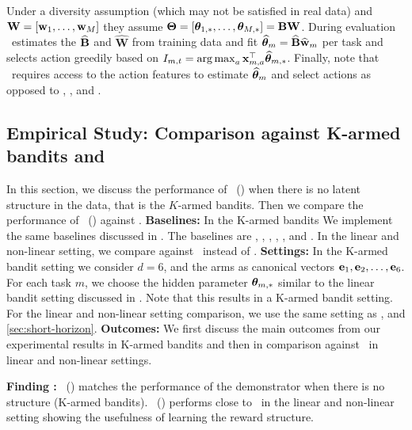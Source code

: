 \documentclass[10pt]{article}
\theoremstyle{plain}
\theoremstyle{definition}
\theoremstyle{remark}
\newcounter{findingcounter}
\newcommand{\customfinding}[1][\normalfont]{\stepcounter{findingcounter}\textbf{Finding \thefindingcounter:}#1 }
\begin{document}
Under a diversity assumption (which may not be satisfied in real data) and $\mathbf{W}=\left[\mathbf{w}_1, \ldots, \mathbf{w}_M\right]$ they assume $\mathbf{\Theta} =\left[\boldsymbol{\theta}_{1,*}, \ldots, \boldsymbol{\theta}_{M,*}\right]=\mathbf{B} \mathbf{W}$.
During evaluation \mlin\ estimates the $\mathbf{\widehat{B}}$ and $\widehat{\mathbf{W}}$ from training data and fit $\widehat{\boldsymbol{\theta}}_{m}=\mathbf{\widehat{B}} \widehat{\mathbf{w}}_m$ per task and selects action greedily based on $I_{m,t} = \mathop{\rm arg\,max}_a \mathbf{x}_{m,a}^\top\widehat{\boldsymbol{\theta}}_{m,*}$. Finally, note that \mlin\ requires access to the action features to estimate $\widehat{\boldsymbol{\theta}}_{m}$ and select actions as opposed to \dpt, \ad, and \pred.
\subsection{Empirical Study: Comparison against K-armed bandits and \dpt}
\label{sec:k_arms_dpt}
In this section, we discuss the performance of \pred\ (\gt) when there is no latent structure in the data, that is the $K$-armed bandits. Then we compare the performance of \pred\ (\gt) against \dpt.
\textbf{Baselines:} In the K-armed bandits We implement the same baselines discussed in . The baselines are \pred, \predt, \dptg, \ad, \ts, and \linucb. In the linear and non-linear setting, we compare against \dpt\ instead of \dptg.
\textbf{Settings:} In the K-armed bandit setting we consider $d=6$, and the arms as canonical vectors $\mathbf{e}_1, \mathbf{e}_2, \ldots, \mathbf{e}_6$. For each task $m$, we choose the hidden parameter $\boldsymbol{\theta}_{m,*}$ similar to the linear bandit setting discussed in . Note that this results in a K-armed bandit setting. For the linear and non-linear setting comparison, we use the same setting as , and \ref{sec:short-horizon}.
\textbf{Outcomes:} We first discuss the main outcomes from our experimental results in K-armed bandits and then in comparison against \dpt\ in linear and non-linear settings.
\begin{tcolorbox}
\customfinding \pred\ (\gt) matches the performance of the demonstrator when there is no structure (K-armed bandits). \pred\ (\gt) performs close to \dpt\ in the linear and non-linear setting showing the usefulness of learning the reward structure.
\end{tcolorbox}
\end{document}
